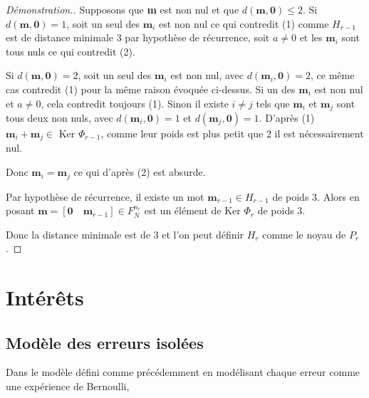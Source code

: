 \documentclass[10pt]{article}
\begin{document}
\begin{proof}[Démonstration.]
Supposons que \textbf{m} est non nul et que $d(\textbf{m},\textbf{0}) \leq 2$.
Si $d(\textbf{m},\textbf{0})=1$, soit un seul des $\textbf{m}_i$ est non nul ce qui contredit (1) comme $H_{r-1}$ est de distance minimale 3 par hypothèse de récurrence, soit $a \neq 0$ et les $\textbf{m}_i$ sont tous nuls ce qui contredit (2).

 Si $d(\textbf{m},\textbf{0})=2$, soit un seul des $\textbf{m}_i$ est non nul, avec $d(\textbf{m}_i,\textbf{0}) = 2$, ce même cas contredit (1) pour la même raison évoquée ci-dessus. Si un des $\textbf{m}_i$ est non nul et $a \neq 0$, cela contredit toujours (1). Sinon il existe $i \neq j$ tels que $\textbf{m}_i$ et $\textbf{m}_j$ sont tous deux non nuls, avec $d(\textbf{m}_i,\textbf{0})=1$ et $d(\textbf{m}_j,\textbf{0})=1$. D'après (1) $\textbf{m}_i + \textbf{m}_j \in $ Ker $\Phi_{r-1}$, comme leur poids est plus petit que 2 il est nécessairement nul.

Donc $\textbf{m}_i=\textbf{m}_j$ ce qui d'après (2) est absurde.

Par hypothèse de récurrence, il existe un mot $\textbf{m}_{r-1} \in H_{r-1}$ de poids 3. Alors en posant $\textbf{m}=[\textbf{0} \quad \textbf{m}_{r-1}] \in F_N^{n_r}$ est un élément de Ker $\Phi_r$ de poids 3. 

Donc la distance minimale est de 3 et l'on peut définir $H_r$ comme le noyau de $P_r$.
\end{proof}

\section{Intérêts}
\subsection{Modèle des erreurs isolées}
Dans le modèle défini comme précédemment en modélisant chaque erreur comme une expérience de Bernoulli, 

\end{document}
